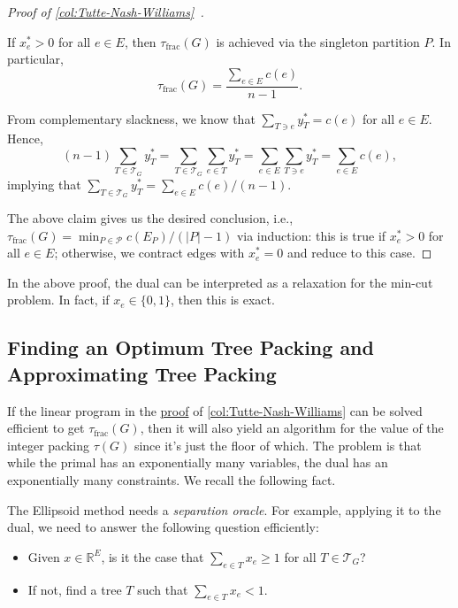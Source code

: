 \begin{proof}[Proof of \autoref{col:Tutte-Nash-Williams}~\cite{chekuri2017near}]
	\begin{claim}
		If \(x^{\ast} _e > 0\) for all \(e \in E\), then \(\tau _{\text{frac} }(G)\) is achieved via the singleton partition \(P\). In particular,
		\[
			\tau _{\text{frac} }(G)
			= \frac{\sum_{e \in E} c(e)}{n - 1}.
		\]
	\end{claim}
	\begin{explanation}
		From complementary slackness, we know that \(\sum_{T \ni e} y^{\ast} _T = c(e)\) for all \(e\in E\). Hence,
		\[
			(n-1) \sum_{T \in \mathcal{T} _G} y^{\ast} _T
			= \sum_{T \in \mathcal{T} _G} \sum_{e \in T} y^{\ast} _T
			= \sum_{e \in E} \sum_{T \ni e} y^{\ast} _T
			= \sum_{e \in E} c(e),
		\]
		implying that \(\sum_{T \in \mathcal{T} _G} y^{\ast} _T = \sum_{e\in E} c(e) / (n-1)\).
	\end{explanation}
	The above claim gives us the desired conclusion, i.e., \(\tau _{\text{frac} } (G) = \min _{P \in \mathcal{P} } c(E_P) / (\lvert P \rvert - 1)\) via induction: this is true if \(x^{\ast} _e >0\) for all \(e\in E\); otherwise, we contract edges with \(x^{\ast} _e = 0\) and reduce to this case.
\end{proof}

\begin{remark}
	In the above proof, the dual can be interpreted as a relaxation for the min-cut problem. In fact, if \(x_e \in \{ 0, 1 \} \), then this is exact.
\end{remark}

\subsection{Finding an Optimum Tree Packing and Approximating Tree Packing}
If the linear program in the \hyperref[pf:col:Tutte-Nash-Williams]{proof} of \autoref{col:Tutte-Nash-Williams} can be solved efficient to get \(\tau _{\text{frac} }(G)\), then it will also yield an algorithm for the value of the integer packing \(\tau (G)\) since it's just the floor of which. The problem is that while the primal has an exponentially many variables, the dual has an exponentially many constraints. We recall the following fact.

\begin{prev}
	The Ellipsoid method needs a \emph{separation oracle}. For example, applying it to the dual, we need to answer the following question efficiently:
	\begin{itemize}
		\item Given \(x \in \mathbb{R} ^E\), is it the case that \(\sum_{e \in T} x_e \geq 1\) for all \(T \in \mathcal{T} _G\)?
		\item If not, find a tree \(T\) such that \(\sum_{e \in T} x_e < 1\).
	\end{itemize}
\end{prev}

